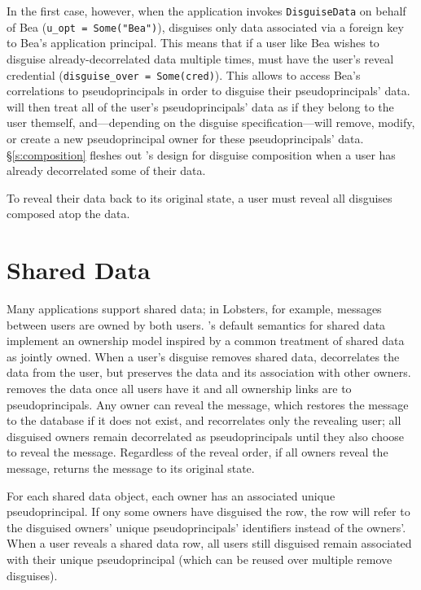 In the first case, however, when the application invokes \texttt{DisguiseData}
on behalf of Bea (\texttt{u\_opt = Some("Bea")}), \sys disguises only data
associated via a foreign key to Bea's application principal.
%
This means that if a user like Bea wishes to disguise already-decorrelated data
multiple times, \sys must have the user's reveal credential
(\texttt{disguise\_over = Some(cred)}). This allows \sys to access Bea's
correlations to pseudoprincipals in order to disguise their pseudoprincipals'
data.
%
\sys will then treat all of the user's pseudoprincipals' data as if they belong
to the user themself, and---depending on the disguise specification---will
remove, modify, or create a new pseudoprincipal owner for these
pseudoprincipals' data.
%
\S\ref{s:composition} fleshes out \sys's design for disguise composition when
a user has already decorrelated some of their data.

%
To reveal their data back to its original state, a user must reveal all
disguises composed atop the data.
%

\section{Shared Data}
Many applications support shared data; in Lobsters, for example, messages
between users are owned by both users.
%
\sys's default semantics for shared data implement an ownership model inspired
by a common treatment of shared data as jointly owned.
%
When a user's disguise removes shared data, \sys decorrelates the data from the
\xxing user, but preserves the data and its association with other owners.
%
\sys removes the data once all users have \xxed it and all ownership links are
to pseudoprincipals.
%
Any owner can reveal the message, which restores the message to the database if
it does not exist, and recorrelates only the revealing user; all disguised
owners remain decorrelated as pseudoprincipals until they also choose to reveal
the message.
%
Regardless of the reveal order, if all owners reveal the message, \sys returns
the message to its original state.
%

%
For each shared data object, each owner has an associated unique
pseudoprincipal. If ony some owners have disguised the row, the row will refer
to the disguised owners' unique pseudoprincipals' identifiers instead of the
owners'.
%
When a user reveals a shared data row, all users still disguised remain
associated with their unique pseudoprincipal (which can be reused over multiple
remove disguises).
%

